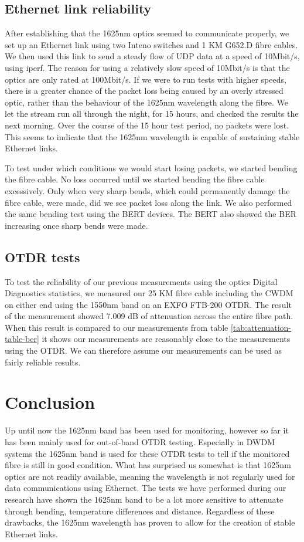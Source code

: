 \documentclass{article}
\begin{document}
\subsection{Ethernet link reliability}
After establishing that the 1625nm optics seemed to communicate properly, we set up an Ethernet link using two Inteno switches and 1 KM G652.D fibre cables.
We then used this link to send a steady flow of UDP data at a speed of 10Mbit/s, using iperf.
The reason for using a relatively slow speed of 10Mbit/s is that the optics are only rated at 100Mbit/s.
If we were to run tests with higher speeds, there is a greater chance of the packet loss being caused by an overly stressed optic, rather than the behaviour of the 1625nm wavelength along the fibre.
We let the stream run all through the night, for 15 hours, and checked the results the next morning.
Over the course of the 15 hour test period, no packets were lost.
This seems to indicate that the 1625nm wavelength is capable of sustaining stable Ethernet links.

To test under which conditions we would start losing packets, we started bending the fibre cable.
No loss occurred until we started bending the fibre cable excessively.
Only when very sharp bends, which could permanently damage the fibre cable, were made, did we see packet loss along the link.
We also performed the same bending test using the BERT devices.
The BERT also showed the BER increasing once sharp bends were made.

\subsection{OTDR tests}
To test the reliability of our previous measurements using the optics Digital Diagnostics statistics, we measured our 25 KM fibre cable including the CWDM on either end using the 1550nm band on an EXFO FTB-200 OTDR.
The result of the measurement showed 7.009 dB of attenuation across the entire fibre path.
When this result is compared to our measurements from table \ref{tab:attenuation-table-ber} it shows our measurements are reasonably close to the measurements using the OTDR.
We can therefore assume our measurements can be used as fairly reliable results.



\newpage
\section{Conclusion}
Up until now the 1625nm band has been used for monitoring, however so far it has been mainly used for out-of-band OTDR testing.
Especially in DWDM systems the 1625nm band is used for these OTDR tests to tell if the monitored fibre is still in good condition.
What has surprised us somewhat is that 1625nm optics are not readily available, meaning the wavelength is not regularly used for data communications using Ethernet.
The tests we have performed during our research have shown the 1625nm band to be a lot more sensitive to attenuate through bending, temperature differences and distance.
Regardless of these drawbacks, the 1625nm wavelength has proven to allow for the creation of stable Ethernet links.



\end{document}
